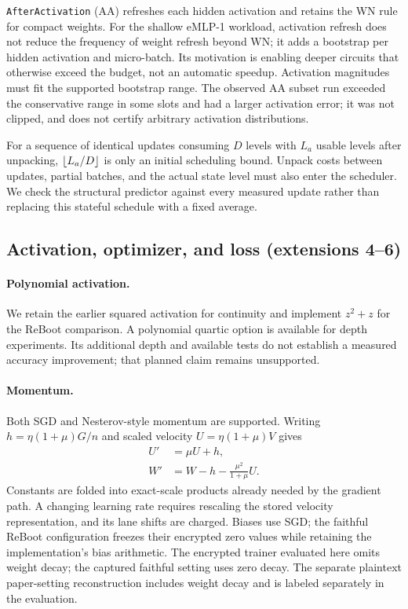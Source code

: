 \texttt{AfterActivation} (AA) refreshes each hidden activation and retains the WN rule for compact weights. For the shallow eMLP-1 workload, activation refresh does not reduce the frequency of weight refresh beyond WN; it adds a bootstrap per hidden activation and micro-batch. Its motivation is enabling deeper circuits that otherwise exceed the budget, not an automatic speedup. Activation magnitudes must fit the supported bootstrap range. The observed AA subset run exceeded the conservative range in some slots and had a larger activation error; it was not clipped, and does not certify arbitrary activation distributions.

For a sequence of identical updates consuming $D$ levels with $L_a$ usable levels after unpacking, $\left\lfloor L_a/D\right\rfloor$ is only an initial scheduling bound. Unpack costs between updates, partial batches, and the actual state level must also enter the scheduler. We check the structural predictor against every measured update rather than replacing this stateful schedule with a fixed average.

\subsection{Activation, optimizer, and loss (extensions 4--6)}
\paragraph{Polynomial activation.}
We retain the earlier squared activation for continuity and implement $z^2+z$ for the ReBoot comparison. A polynomial quartic option is available for depth experiments. Its additional depth and available tests do not establish a measured accuracy improvement; that planned claim remains unsupported.

\paragraph{Momentum.}
Both SGD and Nesterov-style momentum are supported. Writing $h=\eta(1+\mu)G/n$ and scaled velocity $U=\eta(1+\mu)V$ gives
\begin{align}
 U'&=\mu U+h,\nonumber\\
 W'&=W-h-\frac{\mu^2}{1+\mu}U.
 \label{eq:nag}
\end{align}
Constants are folded into exact-scale products already needed by the gradient path. A changing learning rate requires rescaling the stored velocity representation, and its lane shifts are charged. Biases use SGD; the faithful ReBoot configuration freezes their encrypted zero values while retaining the implementation's bias arithmetic. The encrypted trainer evaluated here omits weight decay; the captured faithful setting uses zero decay. The separate plaintext paper-setting reconstruction includes weight decay and is labeled separately in the evaluation.

